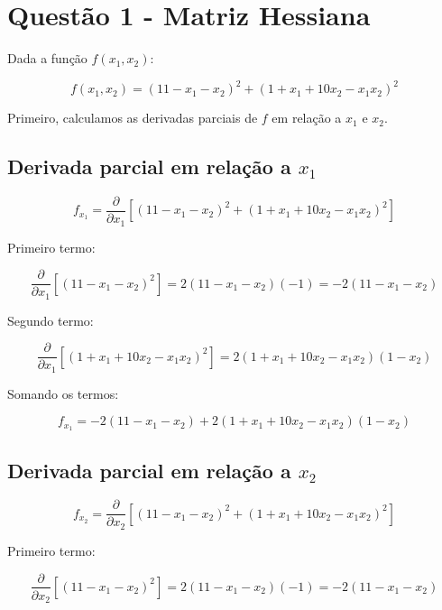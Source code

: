 \documentclass[a4paper, 12pt]{article}
\begin{document}
\newpage


\newpage

\thispagestyle{empty}

\newpage

\newpage

\thispagestyle{empty}

\newpage

\section{Questão 1 - Matriz Hessiana}

Dada a função \( f(x_1, x_2) \):

\[
f(x_1, x_2) = (11 - x_1 - x_2)^2 + (1 + x_1 + 10x_2 - x_1x_2)^2
\]

Primeiro, calculamos as derivadas parciais de \( f \) em relação a \( x_1 \) e \( x_2 \).

\subsection{Derivada parcial em relação a \( x_1 \)}

\[
f_{x_1} = \frac{\partial}{\partial x_1} \left[(11 - x_1 - x_2)^2 + (1 + x_1 + 10x_2 - x_1x_2)^2\right]
\]

Primeiro termo:

\[
\frac{\partial}{\partial x_1} \left[(11 - x_1 - x_2)^2\right] = 2(11 - x_1 - x_2)(-1) = -2(11 - x_1 - x_2)
\]

Segundo termo:

\[
\frac{\partial}{\partial x_1} \left[(1 + x_1 + 10x_2 - x_1x_2)^2\right] = 2(1 + x_1 + 10x_2 - x_1x_2)(1 - x_2)
\]

Somando os termos:

\[
f_{x_1} = -2(11 - x_1 - x_2) + 2(1 + x_1 + 10x_2 - x_1x_2)(1 - x_2)
\]

\subsection{Derivada parcial em relação a \( x_2 \)}

\[
f_{x_2} = \frac{\partial}{\partial x_2} \left[(11 - x_1 - x_2)^2 + (1 + x_1 + 10x_2 - x_1x_2)^2\right]
\]

Primeiro termo:

\[
\frac{\partial}{\partial x_2} \left[(11 - x_1 - x_2)^2\right] = 2(11 - x_1 - x_2)(-1) = -2(11 - x_1 - x_2)
\]
\end{document}
